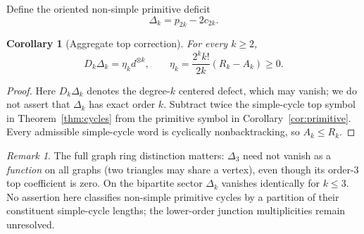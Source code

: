 \documentclass[11pt]{amsart}
\newtheorem{corollary}[theorem]{Corollary}
\theoremstyle{definition}
\theoremstyle{remark}
\newtheorem{remark}[theorem]{Remark}
\begin{document}
Define the oriented non-simple primitive deficit
\[
\Delta_k=p_{2k}-2c_{2k}.
\]
\begin{corollary}[Aggregate top correction]\label{cor:deficit}
For every $k\ge2$,
\begin{equation}\label{eq:deficit}
D_k\Delta_k=\eta_k d^{\otimes k},\qquad
\eta_k=\frac{2^k k!}{2k}(R_k-A_k)\ge0.
\end{equation}
\end{corollary}
\begin{proof}
Here $D_k\Delta_k$ denotes the degree-$k$ centered defect, which may
vanish; we do not assert that $\Delta_k$ has exact order $k$.
Subtract twice the simple-cycle top symbol in
Theorem~\ref{thm:cycles} from the primitive symbol in
Corollary~\ref{cor:primitive}. Every admissible simple-cycle
word is cyclically nonbacktracking, so $A_k\le R_k$.
\end{proof}
\begin{remark}
The full graph ring distinction matters: $\Delta_3$ need not vanish
as a \emph{function} on all graphs (two triangles may share a vertex),
even though its order-$3$ top coefficient is zero. On the bipartite
sector $\Delta_k$ vanishes identically for $k\le3$.
No assertion here classifies non-simple primitive cycles by a partition
of their constituent simple-cycle lengths; the lower-order
junction multiplicities remain unresolved.
\end{remark}
\end{document}
